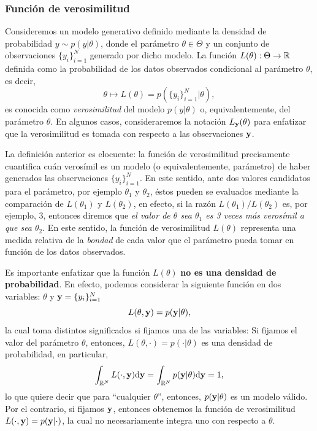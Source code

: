 \subsubsection{Función de verosimilitud} %
\label{sssub:verosimilitud} 

\begin{definition}[Verosimilitud]
Consideremos un  modelo generativo definido mediante la densidad de  probabilidad  $y\sim p(y|\theta)$, donde el  parámetro $\theta\in\Theta$ y un conjunto de observaciones $\{y_i\}_{i=1}^N$ generado por dicho modelo. La función $L(\theta): \Theta \to {\mathbb R}$ definida como la probabilidad de los datos observados condicional al parámetro $\theta$, es decir, 
\begin{equation}
			\theta   \mapsto L(\theta) =  p(\{y_i\}_{i=1}^N | \theta),
\end{equation}
es conocida como \emph{verosimilitud} del modelo $p(y|\theta)$ o, equivalentemente, del  parámetro $\theta$. En algunos casos, consideraremos la  notación $L_{\mathbf{y}}(\theta)$ para enfatizar que la verosimilitud es tomada con respecto a las observaciones  $\mathbf{y}$.
\end{definition}

La definición anterior es elocuente: la función de verosimilitud precisamente cuantifica cuán verosímil es un modelo (o equivalentemente, parámetro) de haber generados las observaciones $\{y_i\}_{i=1}^N$. En este sentido, ante dos valores candidatos para el parámetro, por ejemplo $\theta_1$ y $\theta_2$, éstos pueden se evaluados mediante la comparación de $L(\theta_1)$ y $L(\theta_2)$, en efecto, si la razón $L(\theta_1)/L(\theta_2)$ es, por ejemplo, 3, entonces diremos que \emph{el valor de $\theta$ sea $\theta_1$ es 3 veces más verosímil a que sea $\theta_2$}. En este sentido, la función de verosimilitud  $L(\theta)$ representa una medida relativa de la \emph{bondad} de cada valor que el parámetro pueda tomar en función de los datos observados.

Es importante enfatizar que la función $L(\theta)$ \textbf{no es una densidad de probabilidad}. En efecto, podemos considerar la siguiente función en dos variables: $\theta$ y $\mathbf{y}=\{y_i\}_{i=1}^N$   
\begin{equation}
	L(\theta,\mathbf{y}) = p(\mathbf{y}|\theta),
\end{equation}
la cual toma distintos significados si  fijamos una de las variables: Si fijamos el valor del parámetro $\theta$, entonces, $L(\theta,\cdot) = p(\cdot|\theta)$ es una densidad de probabilidad, en particular, 
\begin{equation}
	\int_{{\mathbb R}^N}L(\cdot,\mathbf{y}){\text d}\mathbf{y} = \int_{{\mathbb R}^N}p(\mathbf{y}|\theta){\text d}\mathbf{y} = 1,
\end{equation}
lo que quiere decir que para ``cualquier $\theta$'', entonces, $p(\mathbf{y}|\theta)$ es un modelo válido. Por el contrario, si fijamos $\mathbf{y}$, entonces obtenemos la función de verosimilitud $L(\cdot,\mathbf{y}) = p(\mathbf{y}|\cdot)$, la  cual no necesariamente integra uno con respecto a $\theta$.



